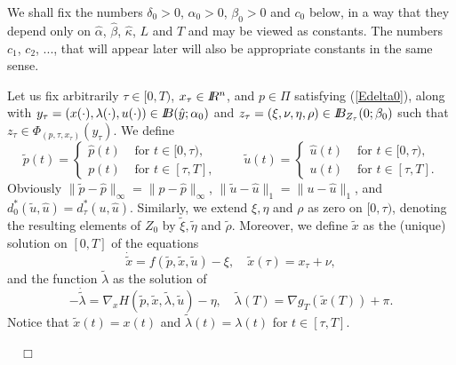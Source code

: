 \documentclass[10pt,a4paper]{amsart}
\renewenvironment{proof}[1]{\par\medskip\noindent\textbf{#1}\enspace\ignorespaces}{\par\medskip}
\newcommand{\B}{I\kern -.35em B}
\newcommand{\R}{I\kern -.35em R}
\newcommand{\al}{\alpha}
\newcommand{\bd}{\begin{displaymath}}
\newcommand{\ed}{\end{displaymath}}
\renewenvironment{proof}[1]{%
\par\vspace{1\baselineskip}%
\noindent{\em Proof#1.\ \ }\ignorespaces }{%
\nobreak\hfill\mbox{\ \ $\Box$}%
\par\vspace{1\baselineskip}%
}
\begin{document}
\begin{proof}{}
We shall fix the numbers $\delta_0 > 0$, $\al_0 > 0$, $\beta_0 > 0$ and $c_0$ below, in a way that they 
depend only on $\hat \al$, $\hat\beta$, $\hat \kappa$, $L$ and $T$ and may be viewed as constants.
The numbers $c_1$, $c_2$, ..., that will appear later will also be appropriate constants in the  same sense.

Let us fix arbitrarily $\tau \in [0,T)$, $x_\tau \in \R^n$, and $p \in \varPi$ satisfying (\ref{Edelta0}), along with 
$y_\tau = (x(\cdot), \lambda(\cdot), u(\cdot)) \in \B(\hat y; \al_0)$ and 
$z_\tau = (\xi,\nu, \eta,\rho) \in \B_{Z_\tau}(0;\beta_0)$ 
such that $z_\tau \in \Phi_{(p,\tau,x_\tau)}(y_\tau)$. We define
\bd
               \tilde p(t) = \left\{ \begin{array}{cl}
                            \hat p(t) & \mbox{ for } t \in [0,\tau), \\ 
                             p(t)   & \mbox{ for } t \in [\tau, T],
                                \end{array} \right. \qquad
               \tilde u(t) = \left\{ \begin{array}{cl}
                            \hat u(t) & \mbox{ for } t \in [0,\tau), \\ 
                             u(t)   & \mbox{ for } t \in [\tau, T].
                                \end{array} \right.
\ed
Obviously $\| \tilde p - \hat p \|_\infty = \| p - \hat p \|_\infty$,  $\| \tilde u - \hat u \|_1 = \| u - \hat  u \|_1$, and 
$d_0^*(\tilde u, \hat u) =d_\tau^*(u,\hat u)$.  Similarly, we extend $\xi,\eta$ and $\rho$ as zero on $[0,\tau)$, denoting the 
resulting elements of $Z_0$ by $\tilde \xi,\tilde\eta$ and $\tilde \rho$.
Moreover, we define $\tilde x$ as the (unique) solution on $[0, T]$ of the equations
\bd
             \dot {\tilde x} = f(\tilde p, \tilde x, \tilde u) -\xi, \quad \tilde x(\tau) = x_ \tau + \nu,
\ed
and the function $\tilde \lambda$ as the  solution of 
\bd
            -\dot {\tilde \lambda} = \nabla_{\!\! x} H(\tilde p, \tilde x, \tilde \lambda,  \tilde u) -\eta, 
               \quad \tilde \lambda(T) = \nabla g_T(\tilde x(T)) + \pi.
\ed
Notice that $\tilde x(t) = x(t)$ and $\tilde \lambda(t) = \lambda(t)$ for $t \in [\tau,T]$.


\end{proof}
\end{document}
